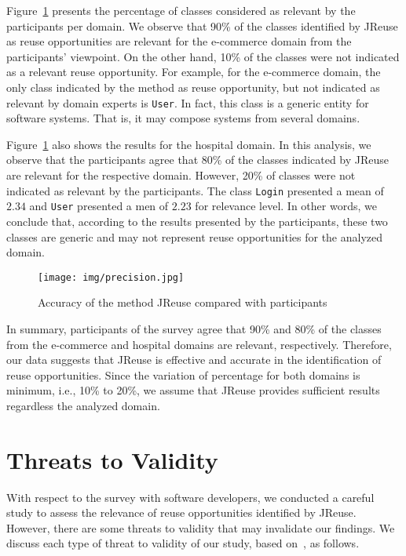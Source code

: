 Figure~\ref{fig:accuracy} presents the percentage of classes considered as relevant by the participants per domain. We observe that 90\% of the classes identified by JReuse as reuse opportunities are relevant for the e-commerce domain from the participants' viewpoint. On the other hand, 10\% of the classes were not indicated as a relevant reuse opportunity. For example, for the e-commerce domain, the only class indicated by the method as reuse opportunity, but not indicated as relevant by domain experts is \texttt{User}. In fact, this class is a generic entity for software systems. That is, it may compose systems from several domains.

Figure~\ref{fig:accuracy} also shows the results for the hospital domain. In this analysis, we observe that the participants agree that 80\% of the classes indicated by JReuse are relevant for the respective domain. However, 20\% of classes were not indicated as relevant by the  participants. The class \texttt{Login}  presented a mean of $2.34$ and \texttt{User} presented a men of $2.23$ for relevance level. In other words, we conclude that, according to the results presented by the participants, these two classes are generic and  may not represent reuse opportunities for the analyzed domain.

\begin{figure}[!h]
\centering
\texttt{[image: img/precision.jpg]}
\caption{Accuracy of the method JReuse compared with participants}
\label{fig:accuracy}
\end{figure}

\newpage
In summary, participants of the survey agree that 90\% and 80\% of the classes from the e-commerce and hospital domains are relevant, respectively. Therefore, our data suggests that JReuse is effective and accurate in the identification of reuse opportunities. Since the variation of percentage for both domains is minimum, i.e., 10\% to 20\%, we assume that JReuse provides sufficient results regardless the analyzed domain.


\section{Threats to Validity}
\label{ch5sc:threatsValidity}

With respect to the survey with software developers, we conducted a careful study to assess the relevance of reuse opportunities identified by JReuse. However, there are some threats to validity that may invalidate our findings. We discuss each type of threat to validity of our study, based on~\cite{wohlin2012experimentation}, as follows. \\


